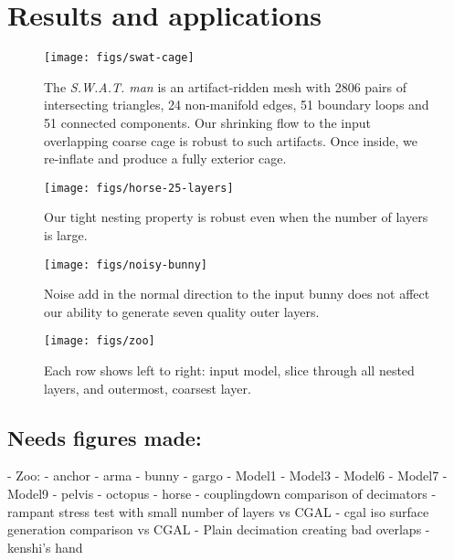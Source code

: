 
\section{Results and applications}
\label{sec:results}




\begin{figure}
  \texttt{[image: figs/swat-cage]}
  \caption{The \emph{S.W.A.T. man} is an artifact-ridden mesh with 2806 pairs
  of intersecting triangles, 24 non-manifold edges, 51 boundary loops and 51
  connected components. Our shrinking flow to the input overlapping coarse cage
  is robust to such artifacts. Once inside, we re-inflate and produce a fully
  exterior cage.}
  \label{fig:swat-cage}
\end{figure}

\begin{figure}
  \texttt{[image: figs/horse-25-layers]}
  \caption{Our tight nesting property is robust even when the number of layers
  is large.}
  \label{fig:horse-25-layers}
\end{figure}

\begin{figure}
  \texttt{[image: figs/noisy-bunny]}
  \caption{Noise add in the normal direction to the input bunny does not
  affect our ability to generate seven quality outer layers.}
  \label{fig:noisy-bunny}
\end{figure}

\begin{figure}
  \texttt{[image: figs/zoo]}
  \caption{Each row shows left to right: input model, slice through all nested
  layers, and outermost, coarsest layer.}
  \label{fig:zoo}
\end{figure}

\subsection{Needs figures made:}
- Zoo:
  - anchor
  - arma
  - bunny
  - gargo
  - Model1
  - Model3
  - Model6
  - Model7
  - Model9
  - pelvis
  - octopus
  - horse
- couplingdown comparison of decimators
- rampant stress test with small number of layers vs CGAL
- cgal iso surface generation comparison vs CGAL
- Plain decimation creating bad overlaps
- kenshi's hand



